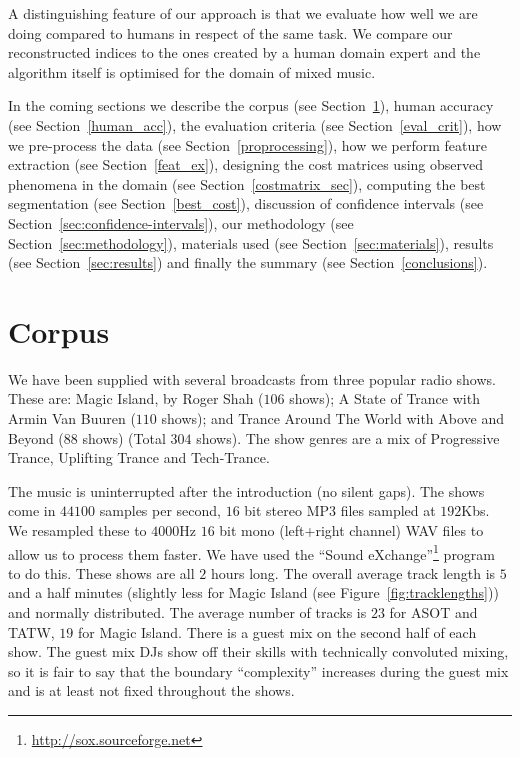\documentclass[twocolumn]{article}
\begin{document}
	\citep{hauptmann1998story}
	
	A distinguishing feature of our approach is that we evaluate how well we are doing compared to humans in respect of the same task. We compare our reconstructed indices to the ones created by a human domain expert and the algorithm itself is optimised for the domain of mixed music. 
	
	
	In the coming sections we describe the corpus (see Section~\ref{dataset}), human accuracy (see Section~\ref{human_acc}),  the evaluation criteria (see Section~\ref{eval_crit}), how we pre-process the data (see Section~\ref{proprocessing}), how we perform feature extraction (see Section~\ref{feat_ex}), designing the cost matrices using observed phenomena in the domain (see Section~\ref{costmatrix_sec}), computing the best segmentation (see Section~\ref{best_cost}), discussion of confidence intervals (see Section~\ref{sec:confidence-intervals}), our methodology (see Section~\ref{sec:methodology}), materials used (see Section~\ref{sec:materials}), results (see Section~\ref{sec:results}) and finally the summary (see Section~\ref{conclusions}).
	
	\section{Corpus}\label{dataset}
	
	We have been supplied with several broadcasts from three popular radio shows. These are: Magic Island, by Roger Shah ($106$ shows); A State of Trance with Armin Van Buuren ($110$ shows); and Trance Around The World with Above and Beyond ($88$ shows) (Total $304$ shows). The show genres are a mix of Progressive Trance, Uplifting Trance and Tech-Trance. 
	
	The music is uninterrupted after the introduction (no silent gaps). 
	The shows come in $44100$ samples per second, $16$ bit stereo MP3 files sampled at $192$Kbs. We resampled these to $4000$Hz $16$ bit mono (left+right channel) WAV files to allow us to process them faster. We have used the ``Sound eXchange''\footnote{\url{http://sox.sourceforge.net}}  program to do this. These shows are all $2$ hours long. The overall average track length is $5$ and a half minutes (slightly less for Magic Island (see Figure~\ref{fig:tracklengths})) and normally distributed. The average number of tracks is $23$ for ASOT and TATW, $19$ for Magic Island. There is a guest mix on the second half of each show. The guest mix DJs show off their skills with technically convoluted mixing, so it is fair to say that the boundary ``complexity'' increases during the guest mix and is at least not fixed throughout the shows.
	
\end{document}

